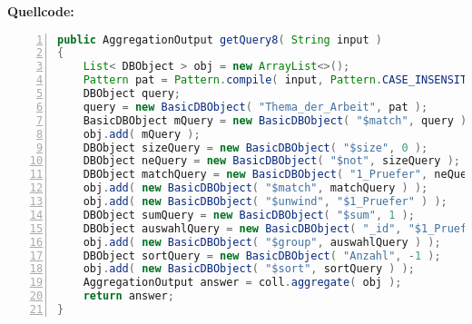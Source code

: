 \textbf{Quellcode:}

\begin{lstlisting}[caption={Quellcode zu Use Case 8},language=java,captionpos=t,numbers=left, numberstyle=\tiny,basicstyle=\scriptsize,breaklines=true]
public AggregationOutput getQuery8( String input )
{
    List< DBObject > obj = new ArrayList<>();
    Pattern pat = Pattern.compile( input, Pattern.CASE_INSENSITIVE );
    DBObject query;
    query = new BasicDBObject( "Thema_der_Arbeit", pat );
    BasicDBObject mQuery = new BasicDBObject( "$match", query );
    obj.add( mQuery );
    DBObject sizeQuery = new BasicDBObject( "$size", 0 );
    DBObject neQuery = new BasicDBObject( "$not", sizeQuery );
    DBObject matchQuery = new BasicDBObject( "1_Pruefer", neQuery );
    obj.add( new BasicDBObject( "$match", matchQuery ) );
    obj.add( new BasicDBObject( "$unwind", "$1_Pruefer" ) );
    DBObject sumQuery = new BasicDBObject( "$sum", 1 );
    DBObject auswahlQuery = new BasicDBObject( "_id", "$1_Pruefer" ).append( "Anzahl", sumQuery );
    obj.add( new BasicDBObject( "$group", auswahlQuery ) );
    DBObject sortQuery = new BasicDBObject( "Anzahl", -1 );
    obj.add( new BasicDBObject( "$sort", sortQuery ) );
    AggregationOutput answer = coll.aggregate( obj );
    return answer;
}
\end{lstlisting}\label{lst:query8code}